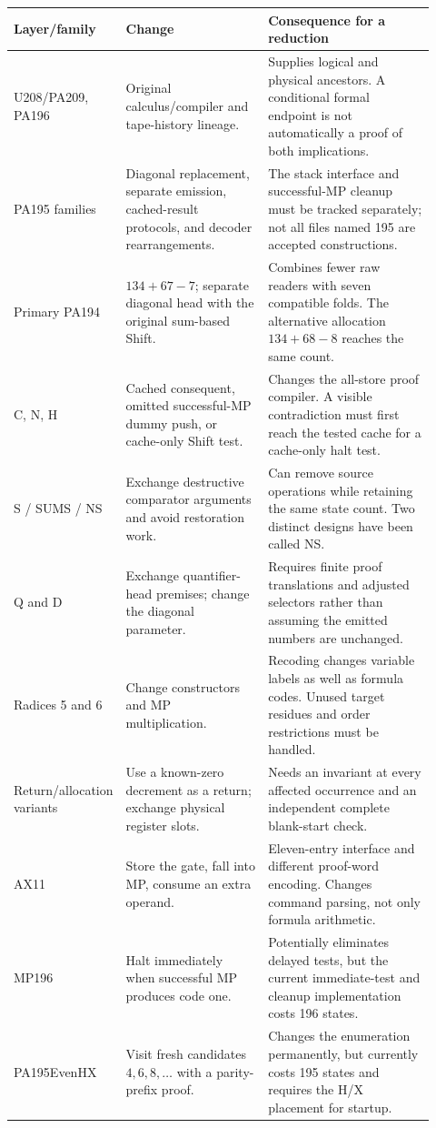 \documentclass[10pt,letterpaper]{article}
\begin{document}
\begin{longtable}{@{}p{0.18\linewidth}p{0.34\linewidth}p{0.40\linewidth}@{}}
\toprule
Layer/family & Change & Consequence for a reduction\\
\midrule\endhead
U208/PA209, PA196 &
Original calculus/compiler and tape-history lineage. &
Supplies logical and physical ancestors. A conditional formal endpoint
is not automatically a proof of both implications.\\[3pt]
PA195 families &
Diagonal replacement, separate emission, cached-result protocols,
and decoder rearrangements. &
The stack interface and successful-MP cleanup must be tracked separately;
not all files named 195 are accepted constructions.\\[3pt]
Primary PA194 &
$134+67-7$; separate diagonal head with the original sum-based Shift. &
Combines fewer raw readers with seven compatible folds. The alternative
allocation $134+68-8$ reaches the same count.\\[3pt]
C, N, H &
Cached consequent, omitted successful-MP dummy push, or cache-only
Shift test. &
Changes the all-store proof compiler. A visible contradiction must first
reach the tested cache for a cache-only halt test.\\[3pt]
S / SUMS / NS &
Exchange destructive comparator arguments and avoid restoration work. &
Can remove source operations while retaining the same state count.
Two distinct designs have been called NS.\\[3pt]
Q and D &
Exchange quantifier-head premises; change the diagonal parameter. &
Requires finite proof translations and adjusted selectors rather than
assuming the emitted numbers are unchanged.\\[3pt]
Radices 5 and 6 &
Change constructors and MP multiplication. &
Recoding changes variable labels as well as formula codes. Unused target
residues and order restrictions must be handled.\\[3pt]
Return/allocation variants &
Use a known-zero decrement as a return; exchange physical register slots. &
Needs an invariant at every affected occurrence and an independent complete
blank-start check.\\[3pt]
AX11 &
Store the gate, fall into MP, consume an extra operand. &
Eleven-entry interface and different proof-word encoding. Changes
command parsing, not only formula arithmetic.\\[3pt]
MP196 &
Halt immediately when successful MP produces code one. &
Potentially eliminates delayed tests, but the current immediate-test and
cleanup implementation costs 196 states.\\[3pt]
PA195EvenHX &
Visit fresh candidates $4,6,8,\ldots$ with a parity-prefix proof. &
Changes the enumeration permanently, but currently costs 195 states and
requires the H/X placement for startup.\\
\bottomrule
\end{longtable}
\end{document}

